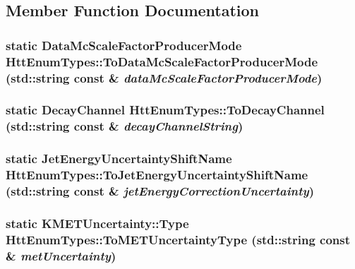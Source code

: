 \subsection{Member Function Documentation}
\hypertarget{classHttEnumTypes_abe7f692e07853746cabcc3aeb42ef2a2}{
\subsubsection[{ToDataMcScaleFactorProducerMode}]{\setlength{\rightskip}{0pt plus 5cm}static {\bf DataMcScaleFactorProducerMode} HttEnumTypes::ToDataMcScaleFactorProducerMode (std::string const \& {\em dataMcScaleFactorProducerMode})}}
\label{classHttEnumTypes_abe7f692e07853746cabcc3aeb42ef2a2}
\hypertarget{classHttEnumTypes_a3c7b9fab8510ad33cafc5f890909c127}{
\subsubsection[{ToDecayChannel}]{\setlength{\rightskip}{0pt plus 5cm}static {\bf DecayChannel} HttEnumTypes::ToDecayChannel (std::string const \& {\em decayChannelString})}}
\label{classHttEnumTypes_a3c7b9fab8510ad33cafc5f890909c127}
\hypertarget{classHttEnumTypes_a82c461652277ddc65ef035985ff5066d}{
\subsubsection[{ToJetEnergyUncertaintyShiftName}]{\setlength{\rightskip}{0pt plus 5cm}static {\bf JetEnergyUncertaintyShiftName} HttEnumTypes::ToJetEnergyUncertaintyShiftName (std::string const \& {\em jetEnergyCorrectionUncertainty})}}
\label{classHttEnumTypes_a82c461652277ddc65ef035985ff5066d}
\hypertarget{classHttEnumTypes_a1e57ba49f33662a1f03ce1204bded48a}{
\subsubsection[{ToMETUncertaintyType}]{\setlength{\rightskip}{0pt plus 5cm}static KMETUncertainty::Type HttEnumTypes::ToMETUncertaintyType (std::string const \& {\em metUncertainty})}}
